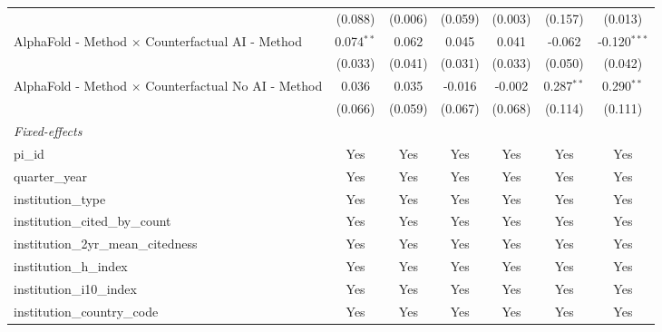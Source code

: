 \begin{tabular}{lcccccc}
                                                               & (0.088)       & (0.006)       & (0.059)       & (0.003)       & (0.157)       & (0.013)\\   
   AlphaFold - Method $\times$ Counterfactual AI - Method      & 0.074$^{**}$  & 0.062         & 0.045         & 0.041         & -0.062        & -0.120$^{***}$\\   
                                                               & (0.033)       & (0.041)       & (0.031)       & (0.033)       & (0.050)       & (0.042)\\   
   AlphaFold - Method $\times$ Counterfactual No AI - Method   & 0.036         & 0.035         & -0.016        & -0.002        & 0.287$^{**}$  & 0.290$^{**}$\\   
                                                               & (0.066)       & (0.059)       & (0.067)       & (0.068)       & (0.114)       & (0.111)\\   
   \midrule
   \emph{Fixed-effects}\\
   pi\_id                                                      & Yes           & Yes           & Yes           & Yes           & Yes           & Yes\\  
   quarter\_year                                               & Yes           & Yes           & Yes           & Yes           & Yes           & Yes\\  
   institution\_type                                           & Yes           & Yes           & Yes           & Yes           & Yes           & Yes\\  
   institution\_cited\_by\_count                               & Yes           & Yes           & Yes           & Yes           & Yes           & Yes\\  
   institution\_2yr\_mean\_citedness                           & Yes           & Yes           & Yes           & Yes           & Yes           & Yes\\  
   institution\_h\_index                                       & Yes           & Yes           & Yes           & Yes           & Yes           & Yes\\  
   institution\_i10\_index                                     & Yes           & Yes           & Yes           & Yes           & Yes           & Yes\\  
   institution\_country\_code                                  & Yes           & Yes           & Yes           & Yes           & Yes           & Yes\\  

\end{tabular}
